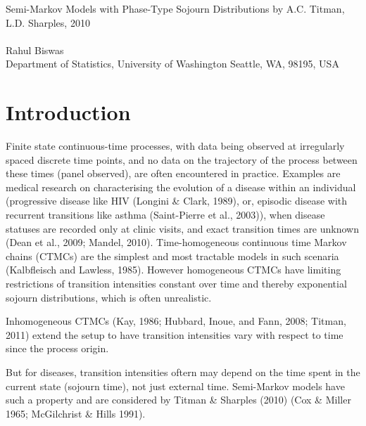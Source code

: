 \documentclass{uwstat572}
\begin{document}

\begin{center}
  {\LARGE Semi-Markov Models with Phase-Type Sojourn Distributions by A.C. Titman, L.D. Sharples, 2010}\\\ \\
  {Rahul Biswas \\ 
    Department of Statistics, University of Washington Seattle, WA, 98195, USA
  }
\end{center}
\nocite{*}
\section{Introduction}

Finite state continuous-time processes, with data being observed at irregularly spaced discrete time points, and no data on the trajectory of the process between these times (panel observed), are often encountered in practice. Examples are medical research on characterising the evolution of a disease within an individual (progressive disease like HIV (Longini \& Clark, 1989), or, episodic disease with recurrent transitions like asthma (Saint-Pierre et al., 2003)), when disease statuses are recorded only at clinic visits, and exact transition times are unknown (Dean et al., 2009; Mandel, 2010).
Time-homogeneous continuous time Markov chains (CTMCs) are the simplest and most tractable models in such scenaria (Kalbfleisch and Lawless, 1985). However homogeneous CTMCs have limiting restrictions of transition intensities constant over time and thereby exponential sojourn distributions, which is often unrealistic.

Inhomogeneous CTMCs (Kay, 1986; Hubbard, Inoue, and Fann, 2008; Titman, 2011) extend the setup to have transition intensities vary with respect to time since the process origin. 

But for diseases, transition intensities oftern may depend on the time spent in the current state (sojourn time), not just external time. Semi-Markov models have such a property and are considered by Titman \& Sharples (2010) (Cox \& Miller 1965; McGilchrist \& Hills 1991).
\end{document}
